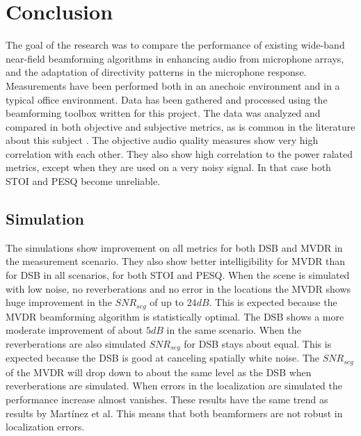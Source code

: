 \chapter{Conclusion}
\label{chap:conclusion}

The goal of the research was to compare the performance of existing wide-band near-field beamforming algorithms in enhancing audio from microphone arrays, and the adaptation of directivity patterns in the microphone response. Measurements have been performed both in an anechoic environment and in a typical office environment. Data has been gathered and processed using the beamforming toolbox written for this project. The data was analyzed and compared in both objective and subjective metrics, as is common in the literature about this subject \citep{brandstein2001,gaubitch2014,martinez2015,griffiths1982,kjellson2014sound,ba2007,habets2010,doclo2003}. The objective audio quality measures show very high correlation with each other. They also show high correlation to the power ralated metrics, except when they are used on a very noisy signal. In that case both STOI and PESQ become unreliable.

\section{Simulation}
\label{sec:conc:sim}
The simulations show improvement on all metrics for both DSB and MVDR in the measurement scenario. They also show better intelligibility for MVDR than for DSB in all scenarios, for both STOI and PESQ.\newline
When the scene is simulated with low noise, no reverberations and no error in the locations the MVDR shows huge improvement in the $SNR_{seg}$ of up to $24 dB$. This is expected because the MVDR beamforming algorithm is statistically optimal. The DSB shows a more moderate improvement of about $5 dB$ in the same scenario. When the reverberations are also simulated $SNR_{seg}$ for DSB stays about equal. This is expected because the DSB is good at canceling spatially white noise. The $SNR_{seg}$ of the MVDR will drop down to about the same level as the DSB when reverberations are simulated. When errors in the localization are simulated the performance increase almost vanishes. These results have the same trend as results by Mart\'inez et al. \cite{martinez2015} This means that both beamformers are not robust in localization errors.

